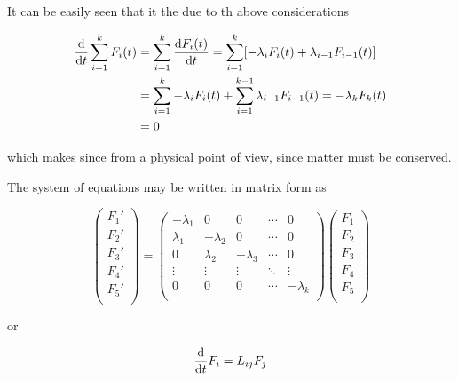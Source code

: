 \documentclass{article}
\theoremstyle{definition}
\theoremstyle{remark}
\begin{document}
It can be easily seen that it the due to th above considerations

\begin{align}
	\dv{t}\sum_{i=1}^{k}F_{i}(t) & =\sum_{i=1}^{k}\dv{F_{i}(t)}{t}=\sum_{i=1}^{k}[-\lambda_{i}F_{i}(t)+\lambda_{i-1}F_{i-1}(t)]            \\
	                             & =\sum_{i=1}^{k}-\lambda_{i}F_{i}(t)+\sum_{i=1}^{k-1}\lambda_{i-1}F_{i-1}(t)=-\lambda_{k}F_{k}(t) \notag \\
	                             & =0\notag
\end{align}

which makes since from a physical point of view, since matter must be conserved.

The system of equations may be written in matrix form as

\begin{equation}
	\begin{pmatrix}
		F_{1}' \\
		F_{2}' \\
		F_{3}' \\
		F_{4}' \\
		F_{5}' \\
	\end{pmatrix}=\begin{pmatrix}
		-\lambda_{1} & 0            & 0            & \cdots & 0            \\
		\lambda_{1}  & -\lambda_{2} & 0            & \cdots & 0            \\
		0            & \lambda_{2}  & -\lambda_{3} & \cdots & 0            \\
		\vdots       & \vdots       & \vdots       & \ddots & \vdots       \\
		0            & 0            & 0            & \cdots & -\lambda_{k} \\
	\end{pmatrix}\begin{pmatrix}
		F_{1} \\
		F_{2} \\
		F_{3} \\
		F_{4} \\
		F_{5} \\
	\end{pmatrix}
\end{equation}

or

\begin{equation}
	\dv{t}F_{i}=L_{ij}F_{j}
	\label{eq:system}
\end{equation}
\end{document}

